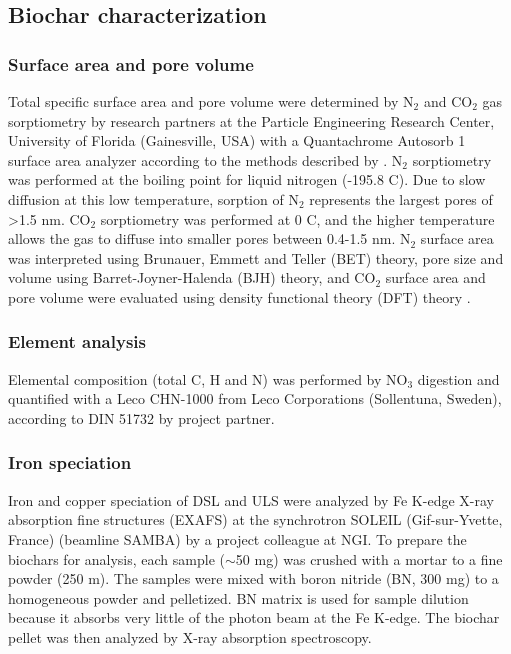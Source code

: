 \subsection{Biochar characterization}

\subsubsection{Surface area and pore volume}
Total specific surface area and pore volume were determined by $\mathrm{N_2}$ and $\mathrm{CO_2}$ gas sorptiometry by research partners at the Particle Engineering Research Center, University of Florida (Gainesville, USA) with a Quantachrome Autosorb 1 surface area analyzer according to the methods described by \cite{kwon2005}.  $\mathrm{N_2}$ sorptiometry was performed at the boiling point for liquid nitrogen (-195.8 \textdegree C). Due to slow diffusion at this low temperature, sorption of  $\mathrm{N_2}$ represents the largest pores of \textgreater 1.5 nm. $\mathrm{CO_2}$ sorptiometry was performed at 0 \textdegree C, and the higher temperature allows the gas to diffuse into smaller pores between 0.4-1.5 nm. $\mathrm{N_2}$ surface area was interpreted using Brunauer, Emmett and Teller (BET) theory, pore size and volume using Barret-Joyner-Halenda (BJH) theory, and $\mathrm{CO_2}$ surface area and pore volume were evaluated using density functional theory (DFT) theory . 

\subsubsection{Element analysis}
Elemental composition (total C, H and N) was performed by $\mathrm{NO_3}$ digestion and quantified with a Leco CHN-1000 from Leco Corporations (Sollentuna, Sweden), according to DIN 51732 by project partner.  

\subsubsection{Iron speciation}
Iron and copper speciation of DSL and ULS were analyzed by Fe K-edge X-ray absorption fine structures (EXAFS) at the synchrotron SOLEIL (Gif-sur-Yvette, France) (beamline SAMBA) by a project colleague at NGI. To prepare the biochars for analysis, each sample ($\sim$50 mg) was crushed with a mortar to a fine powder (250 \textmu m). The samples were mixed with boron nitride (BN, 300 mg) to a homogeneous powder and pelletized. BN matrix is used for sample dilution because it absorbs very little of the photon beam at the Fe K-edge. The biochar pellet was then analyzed by X-ray absorption spectroscopy.  

